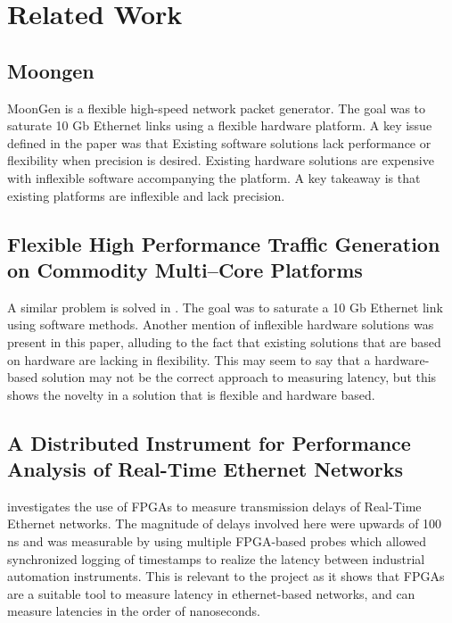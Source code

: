 \section{Related Work}

\subsection{Moongen}

\par MoonGen \cite{moongen} is a flexible high-speed network packet generator. The goal was to saturate 10 Gb 
Ethernet links using a flexible hardware platform. A key issue defined in the paper was that Existing software 
solutions lack performance or flexibility when precision is desired. Existing hardware solutions are expensive with 
inflexible software accompanying the platform. A key takeaway is that existing platforms are inflexible and lack 
precision.

\subsection{Flexible High Performance Traffic Generation on Commodity Multi–Core Platforms}

\par A similar problem is solved in \cite{multicore}. The goal was to saturate a 10 Gb Ethernet link using software 
methods. Another mention of inflexible hardware solutions was present in this paper, alluding to the fact that 
existing solutions that are based on hardware are lacking in flexibility. This may seem to say that a hardware-based 
solution may not be the correct approach to measuring latency, but this shows the novelty in a solution that is 
flexible and hardware based.

\subsection{A Distributed Instrument for Performance Analysis of Real-Time Ethernet Networks}

\cite{realtime} investigates the use of FPGAs to measure transmission delays of Real-Time Ethernet networks. The magnitude
of delays involved here were upwards of 100 ns and was measurable by using multiple FPGA-based probes which allowed 
synchronized logging of timestamps to realize the latency between industrial automation instruments. This is relevant
to the project as it shows that FPGAs are a suitable tool to measure latency in ethernet-based networks, and can
measure latencies in the order of nanoseconds.

